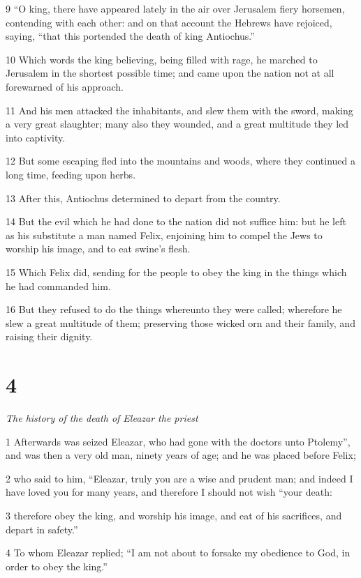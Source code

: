 9 “O king, there have appeared lately in the air over Jerusalem fiery horsemen, contending with each other: and on that account the Hebrews have rejoiced, saying, “that this portended the death of king Antiochus.” 

10 Which words the king believing, being filled with rage, he marched to Jerusalem in the shortest possible time; and came upon the nation not at all forewarned of his approach. 

11 And his men attacked the inhabitants, and slew them with the sword, making a very great slaughter; many also they wounded, and a great multitude they led into captivity. 

12 But some escaping fled into the mountains and woods, where they continued a long time, feeding upon herbs. 

13 After this, Antiochus determined to depart from the country. 

14 But the evil which he had done to the nation did not suffice him: but he left as his substitute a man named Felix, enjoining him to compel the Jews to worship his image, and to eat swine’s flesh. 

15 Which Felix did, sending for the people to obey the king in the things which he had commanded him. 

16 But they refused to do the things whereunto they were called; wherefore he slew a great multitude of them; preserving those wicked orn and their family, and raising their dignity.

\chapter{4}

\par \textit{The history of the death of Eleazar the priest}

1 Afterwards was seized Eleazar, who had gone with the doctors unto Ptolemy”, and was then a very old man, ninety years of age; and he was placed before Felix; 

2 who said to him, “Eleazar, truly you are a wise and prudent man; and indeed I have loved you for many years, and therefore I should not wish “your death: 

3 therefore obey the king, and worship his image, and eat of his sacrifices, and depart in safety.” 

4 To whom Eleazar replied; “I am not about to forsake my obedience to God, in order to obey the king.” 

